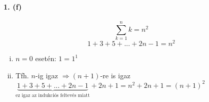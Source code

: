 \documentclass[12pt,a4paper,fleqn]{article}
\newcommand{\myparagraph}[1]{\paragraph{#1}\mbox{}}
\begin{document}
\myparagraph{1. (f)}
\[ \sum_{k=1}^{n} k = n^2 \]
\[ 1+3+5+...+2n-1 = n^2 \]
\begin{enumerate}[i.]
  \item $n=0$ esetén: $1=1^1$ \checkmark
  \item Tfh. $n$-ig igaz $\Rightarrow (n+1)$-re is igaz \\
    $\underbrace{1+3+5+...+2n-1}_{\text{ez igaz az indukciós feltevés miatt}}
    + 2n+1 = n^2 + 2n + 1 = (n+1)^2$ \checkmark
\end{enumerate}

\clearpage
\tableofcontents
\end{document}
